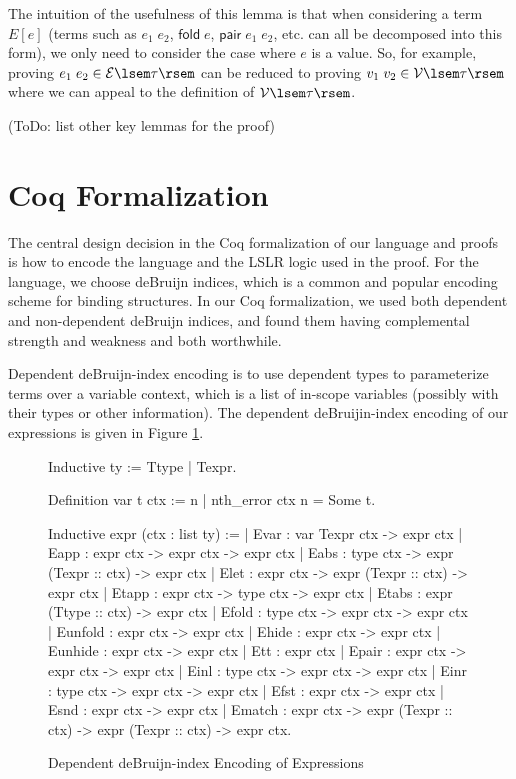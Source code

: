 \documentclass[preprint]{sigplanconf}
\newcommand{\symfold}{\mathsf{fold}}
\newcommand{\sympair}{\mathsf{pair}}
\newcommand{\relV}[1]{\mathcal{V}\lsem#1\rsem}
\newcommand{\relE}[1]{\mathcal{E}\lsem#1\rsem}
\begin{document}
The intuition of the usefulness of this lemma is that when considering a term $E[e]$ (terms such as $e_1\;e_2$, $\symfold\; e$, $\sympair\;e_1\;e_2$, etc. can all be decomposed into this form), we only need to consider the case where $e$ is a value. So, for example, proving $e_1\;e_2\in\relE{\tau}$ can be reduced to proving $v_1\;v_2\in\relV{\tau}$ where we can appeal to the definition of $\relV{\tau}$.

(ToDo: list other key lemmas for the proof)

\section{\label{section-coq}Coq Formalization}

The central design decision in the Coq formalization of our language and proofs is how to encode the language and the LSLR logic used in the proof. For the language, we choose deBruijn indices, which is a common and popular encoding scheme for binding structures. In our Coq formalization, we used both dependent and non-dependent deBruijn indices, and found them having complemental strength and weakness and both worthwhile.

Dependent deBruijn-index encoding is to use dependent types to parameterize terms over a variable context, which is a list of in-scope variables (possibly with their types or other information). The dependent deBruijin-index encoding of our expressions is given in Figure \ref{coq-depdeb}.

\begin{figure}
\begin{coq}
Inductive ty := Ttype | Texpr.

Definition var t ctx := {n | nth_error ctx n = Some t}.

Inductive expr (ctx : list ty) :=
| Evar : var Texpr ctx -> expr ctx
| Eapp : expr ctx -> expr ctx -> expr ctx
| Eabs : type ctx -> expr (Texpr :: ctx) -> expr ctx
| Elet : expr ctx -> expr (Texpr :: ctx) -> expr ctx
| Etapp : expr ctx -> type ctx -> expr ctx
| Etabs : expr (Ttype :: ctx) -> expr ctx
| Efold : type ctx -> expr ctx -> expr ctx
| Eunfold : expr ctx -> expr ctx
| Ehide : expr ctx -> expr ctx
| Eunhide : expr ctx -> expr ctx
| Ett : expr ctx
| Epair : expr ctx -> expr ctx -> expr ctx
| Einl : type ctx -> expr ctx -> expr ctx
| Einr : type ctx -> expr ctx -> expr ctx
| Efst : expr ctx -> expr ctx
| Esnd : expr ctx -> expr ctx
| Ematch : expr ctx -> expr (Texpr :: ctx) -> expr (Texpr :: ctx) -> expr ctx.
\end{coq}
\caption{\label{coq-depdeb}Dependent deBruijn-index Encoding of Expressions}
\end{figure}
\end{document}
